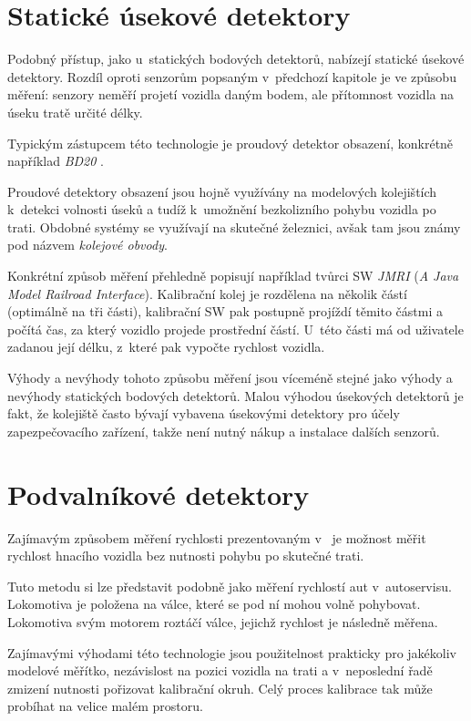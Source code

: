 \section{Statické úsekové detektory}
\label{sec:det-usek}

Podobný přístup, jako u~statických bodových detektorů, nabízejí statické
úsekové detektory. Rozdíl oproti senzorům popsaným v~předchozí kapitole je
ve způsobu měření: senzory neměří projetí vozidla daným bodem, ale přítomnost
vozidla na úseku tratě určité délky.

Typickým zástupcem této technologie je proudový detektor obsazení, konkrétně
například \textit{BD20} \cite{bd20}.

Proudové detektory obsazení jsou hojně využívány na modelových kolejištích k~detekci
volnosti úseků a tudíž k~umožnění bezkolizního pohybu vozidla po trati.
Obdobné systémy se využívají na skutečné železnici, avšak tam jsou známy pod
názvem \textit{kolejové obvody}.

Konkrétní způsob měření přehledně popisují například tvůrci SW \textit{JMRI}
\cite{jmri:speedometer} (\textit{A Java Model Railroad Interface}).
Kalibrační kolej je rozdělena na několik částí (optimálně na tři části), kalibrační
SW pak postupně projíždí těmito částmi a počítá čas, za který vozidlo projede
prostřední částí. U~této části má od uživatele zadanou její délku, z~které pak
vypočte rychlost vozidla.

Výhody a nevýhody tohoto způsobu měření jsou víceméně stejné jako výhody a
nevýhody statických bodových detektorů. Malou výhodou úsekových detektorů je
fakt, že kolejiště často bývají vybavena úsekovými detektory pro účely
zapezpečovacího zařízení, takže není nutný nákup a instalace dalších senzorů.

\section{Podvalníkové detektory}
\label{sec:det-podval}

Zajímavým způsobem měření rychlosti prezentovaným v~\cite{bachrus}
je možnost měřit rychlost hnacího vozidla bez nutnosti pohybu po skutečné trati.

Tuto metodu si lze představit podobně jako měření rychlostí aut v~autoservisu.
Lokomotiva je položena na válce, které se pod ní mohou volně pohybovat.
Lokomotiva svým motorem roztáčí válce, jejichž rychlost je následně měřena.

Zajímavými výhodami této technologie jsou použitelnost prakticky pro jakékoliv
modelové měřítko, nezávislost na pozici vozidla na trati a v~neposlední řadě
zmizení nutnosti pořizovat kalibrační okruh. Celý proces kalibrace tak může
probíhat na velice malém prostoru.

